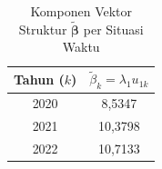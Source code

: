 \begin{table}[H]
\centering
\small
\caption{Komponen Vektor Struktur $\tilde{\boldsymbol{\beta}}$ per Situasi Waktu} \label{tab:sample1beta_vec}
\begin{tabular}{|c|c|}
\hline
\textbf{Tahun ($k$)} & \textbf{$\tilde{\beta}_k = \lambda_1 u_{1k}$} \\
\hline
2020 & 8,5347 \\
2021 & 10,3798 \\
2022 & 10,7133 \\
\hline
\end{tabular}
\end{table}